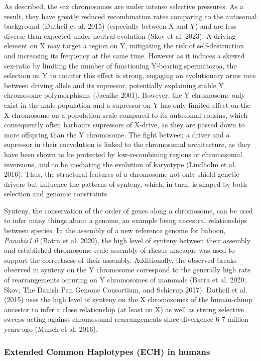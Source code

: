 \documentclass[
  11pt,
  a4paper,
]{scrbook}
\let\oldemph\emph
\renewcommand\emph[1]{\oldemph{\color{gray}#1}}
\begin{document}
As described, the sex chromosomes are under intense selective pressures.
As a result, they have greatly reduced recombination rates comparing to
the autosomal background (Dutheil et al. 2015) (especially between X and
Y) and are less diverse than expected under neutral evolution (Skov et
al. 2023). A driving element on X may target a region on Y, mitigating
the risk of self-destruction and increasing its frequency at the same
time. However as it induces a skewed sex-ratio by limiting the number of
functioning Y-bearing spermatozoa, the selection on Y to counter this
effect is strong, engaging an evolutionary arms race between driving
allele and its supressor, potentially explaining stable Y chromosome
polymorphisms (Jaenike 2001). However, the Y chromosome only exist in
the male population and a supressor on Y has only limited effect on the
X chromosome on a population-scale compared to its autosomal cousins,
which consequently often harbours supressors of X-drive, as they are
passed down to more offspring than the Y chromosome. The fight between a
driver and a supressor in their coevolution is linked to the chromosomal
architecture, as they have been shown to be protected by low-recombining
regions or chromosomal inversions, and to be mediating the evolution of
karyotype (Lindholm et al. 2016). Thus, the structural features of a
chromosome not only shield genetic drivers but influence the patterns of
synteny, which, in turn, is shaped by both selection and genomic
constraints.

Synteny, the conservation of the order of genes along a chromosome, can
be used to infer many things about a genome, an example being ancestral
relationships between species. In the assembly of a new reference genome
for baboon, \emph{Panubis1.0} (Batra et al. 2020), the high level of
synteny between their assembly and established chromosome-scale assembly
of rhesus macaque was used to support the correctness of their assembly.
Additionally, the observed breaks observed in synteny on the Y
chromosome correspond to the generally high rate of rearrangements
occuring on Y chromosomes of mammals (Batra et al. 2020; Skov, The
Danish Pan Genome Consortium, and Schierup 2017). Dutheil et al. (2015)
uses the high level of synteny on the X chromosomes of the human-chimp
ancestor to infer a close relationship (at least on X) as well as strong
selective sweeps acting against chromosomal rearrangements since
divergence 6-7 million years ago (Munch et al. 2016).

\subsubsection{Extended Common Haplotypes (ECH) in
humans}\label{extended-common-haplotypes-ech-in-humans}
\end{document}
